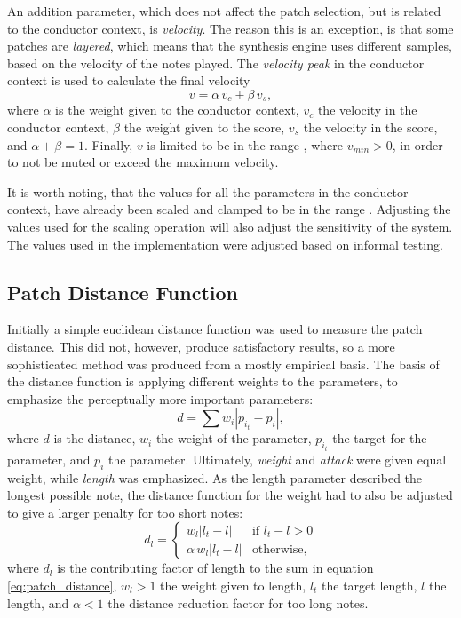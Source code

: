 An addition parameter, which does not affect the patch selection,
but is related to the conductor context,
is \textit{velocity}.
The reason this is an exception,
is that some patches are \textit{layered},
which means that the synthesis engine
uses different samples,
based on the velocity of the notes played.
The \textit{velocity peak} in the conductor context
is used to calculate the final velocity
\begin{equation}
v = \alpha \, v_c + \beta \, v_s,
\end{equation}
where $\alpha$ is the weight given to the conductor context,
$v_c$ the velocity in the conductor context,
$\beta$ the weight given to the score,
$v_s$ the velocity in the score,
and $\alpha + \beta = 1$.
Finally, $v$ is limited to be in the range
, where $v_{min} > 0$,
in order to not be muted or exceed the maximum velocity.

It is worth noting,
that the values for all the parameters
in the conductor context,
have already been scaled and clamped
to be in the range .
Adjusting the values used for the scaling operation
will also adjust the sensitivity of the system.
The values used in the implementation were
adjusted based on informal testing.

\subsection{Patch Distance Function}

Initially a simple euclidean distance function
was used to measure the patch distance.
This did not, however, produce satisfactory results,
so a more sophisticated method was
produced from a mostly empirical basis.
The basis of the distance function is applying
different weights to the parameters,
to emphasize the perceptually more important parameters:
\begin{equation}
d = \sum w_i \left \vert p_{i_t} - p_i \right \vert,
\label{eq:patch_distance}
\end{equation}
where $d$ is the distance,
$w_i$ the weight of the \nth[i] parameter,
$p_{i_t}$ the target for the \nth[i] parameter,
and $p_i$ the \nth[i] parameter.
Ultimately, \textit{weight} and \textit{attack}
were given equal weight,
while \textit{length} was emphasized.
As the length parameter described the
longest possible note,
the distance function for the weight had to also be adjusted
to give a larger penalty for too short notes:
\begin{equation}
d_l =
\begin{cases}
w_l \left \vert l_t - l \right \vert & \text{if } l_t - l > 0 \\
\alpha \, w_l \left \vert l_t - l \right \vert & \text{otherwise},
\end{cases}
\end{equation}
where $d_l$ is the contributing factor of length
to the sum in equation \ref{eq:patch_distance},
$w_l > 1$ the weight given to length,
$l_t$ the target length,
$l$ the length,
and $\alpha < 1$ the distance reduction factor for too long notes.


